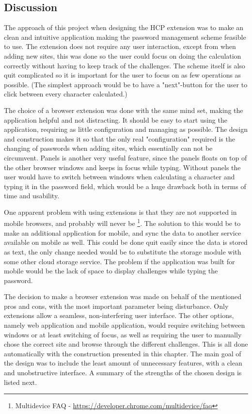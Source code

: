 \subsection{Discussion}
The approach of this project when designing the HCP extension was to make an clean and intuitive application making the password management scheme feasible to use. The extension does not require any user interaction, except from when adding new sites, this was done so the user could focus on doing the calculation correctly without having to keep track of the challenges. The scheme itself is also quit complicated so it is important for the user to focus on as few operations as possible. (The simplest approach would be to have a "next"-button for the user to click between every character calculated.)
\par The choice of a browser extension was done with the same mind set, making the application helpful and not distracting. It should be easy to start using the application, requiring as little configuration and managing as possible. The design and construction makes it so that the only real "configuration" required is the changing of passwords when adding sites, which essentially can not be circumvent. Panels is another very useful feature, since the panels floats on top of the other browser windows and keeps in focus while typing. Without panels the user would have to switch between windows when calculating a character and typing it in the password field, which would be a huge drawback both in terms of time and usability. 
\par One apparent problem with using extensions is that they are not supported in mobile browsers, and probably will never be \footnote{Multidevice FAQ - \url{https://developer.chrome.com/multidevice/faq}}. The solution to this would be to make an additional application for mobile, and sync the data to another service available on mobile as well. This could be done quit easily since the data is stored as text, the only change needed would be to substitute the storage module with some other cloud storage service. The problem if the application was built for mobile would be the lack of space to display challenges while typing the password. 
\par The decision to make a browser extension was made on behalf of the mentioned pros and cons, with the most important parameter being disturbance. Only extensions allow a seamless, non-interfering user interface. The other options, namely web application and mobile application, would require switching between windows or at least switching of focus, as well as requiring the user to manually chose the correct site and browse through the different challenges. This is all done automatically with the construction presented in this chapter. The main goal of the design was to include the least amount of unnecessary features, with a clean and unobstructive interface. A summary of the strengths of the chosen design is listed next.

